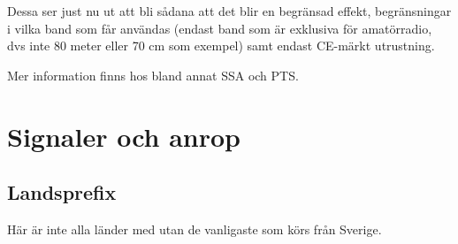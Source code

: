 Dessa ser just nu ut att bli sådana att det blir en begränsad effekt, begränsningar i vilka band som får användas (endast band som är exklusiva för amatörradio, dvs inte 80 meter eller 70 cm som exempel) samt endast CE-märkt utrustning.

Mer information finns hos bland annat SSA och PTS.

\newpage



\section{Signaler och anrop}
\subsection{Landsprefix}

Här är inte alla länder med utan de vanligaste som körs från Sverige.

